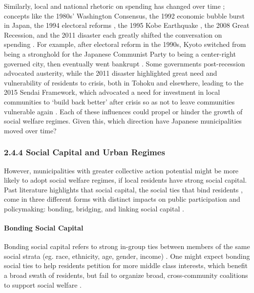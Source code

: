 \documentclass[preprint, 3p,
authoryear]{elsarticle} %
\begin{document}
Similarly, local and national rhetoric on spending has changed over time
\citep{catalinac_2018, estevez_2020}; concepts like the 1980s'
Washington Consensus, the 1992 economic bubble burst in Japan, the 1994
electoral reforms \citep{shinada_2018}, the 1995 Kobe Earthquake
\citep{edgington_2011}, the 2008 Great Recession, and the 2011 disaster
each greatly shifted the conversation on spending \citep{cheek_2020}.
For example, after electoral reform in the 1990s, Kyoto switched from
being a stronghold for the Japanese Communist Party to being a
center-right governed city, then eventually went bankrupt
\citep{sugiyama_takeuchi_2008}. Some governments post-recession
advocated austerity, while the 2011 disaster highlighted great need and
vulnerability of residents to crisis, both in Tohoku and elsewhere,
leading to the 2015 Sendai Framework, which advocated a need for
investment in local communities to `build back better' after crisis so
as not to leave communities vulnerable again
\citep{maly_2020, cheek_2022}. Each of these influences could propel or
hinder the growth of social welfare regimes. Given this, which direction
have Japanese municipalities moved over time?

\hypertarget{social-capital-and-urban-regimes}{%
\subsubsection{2.4.4 Social Capital and Urban
Regimes}\label{social-capital-and-urban-regimes}}

However, municipalities with greater collective action potential might
be more likely to adopt social welfare regimes, if local residents have
strong social capital. Past literature highlights that social capital,
the social ties that bind residents \citep{putnam_2000, woolcock_2010},
come in three different forms with distinct impacts on public
participation and policymaking: bonding, bridging, and linking social
capital \citep{aldrich_and_meyer_2015}.

\hypertarget{bonding-social-capital}{%
\paragraph{Bonding Social Capital}\label{bonding-social-capital}}

Bonding social capital refers to strong in-group ties between members of
the same social strata (eg. race, ethnicity, age, gender, income)
\citep{mcpherson_et_al_2001, mouw_2006}. One might expect bonding social
ties to help residents petition for more middle class interests, which
benefit a broad swath of residents, but fail to organize broad,
cross-community coalitions to support social welfare
\citep{tsai_2007, cox_2011, alcorta_et_al_2020}.
\end{document}
